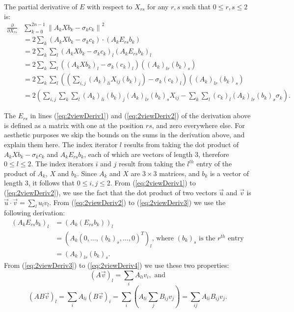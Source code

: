 \documentclass[11pt, oneside, reqno]{book}
\begin{document}
The partial derivative of $E$ with respect to $X_{rs}$ for any $r,s$ such that $0 \le r,s \le 2$ is:
\begin{align}
\frac{\partial}{\partial  X_{rs}} & \sum_{k=0}^{2n-1} \left\| A_k X b_k - \sigma_k c_k \right\|^2 \nonumber\\
&= 2\sum_k \left(A_k X b_k - \sigma_k c_k\right) \cdot \left(A_k E_{rs}b_k\right) \label{eq:2viewDeriv1} \\
&= 2\sum_k \sum_{l} \left(A_k X b_k - \sigma_k c_k\right)_l \left(A_k E_{rs}b_k\right)_l \label{eq:2viewDeriv2} \\
&= 2\sum_k \sum_l 
\left( \left(A_k X b_k\right)_l - \sigma_k \left(c_k\right)_l \right)
\left(\left(A_k\right)_{lr} \left(b_k\right)_s\right) \label{eq:2viewDeriv3} \\
&= 2 \sum_k \sum_l
\left( \left(\sum_{i,j}\left(A_k\right)_{li} X_{ij}\left(b_k\right)_j \right) - \sigma_k \left(c_k\right)_l \right) 
\left(\left(A_k\right)_{lr} \left(b_k\right)_s \right) \label{eq:2viewDeriv4} \\
&= 2\left( 
\sum_{i,j} \sum_k\sum_l \left(A_k\right)_{li} \left(b_k\right)_j \left(A_k\right)_{lr} \left(b_k\right)_s X_{ij} 
- \sum_k \sum_l \left(c_k\right)_l \left(A_k\right)_{lr} \left(b_k\right)_s \sigma_k 
\right). \nonumber
\end{align}

The $E_{rs}$ in lines (\ref{eq:2viewDeriv1}) and (\ref{eq:2viewDeriv2}) of the derivation above is defined as a matrix with one at the position $rs$, and zero everywhere else.
For aesthetic purposes we skip the bounds on the sums in the derivation above, and explain them here. The index iterator $l$ results from taking the dot product of $A_k X b_k - \sigma_k c_k$ and $A_k E_{rs}b_k$, each of which are vectors of length 3, therefore $0 \le l \le 2$. The index iterators $i$ and $j$ result from taking the $l^{th}$ entry of the product of $A_k$, $X$ and $b_k$. Since $A_k$ and $X$ are $3 \times 3$ matrices, and $b_k$ is a vector of length 3, it follows that $0 \le i,j \le 2$. 
From (\ref{eq:2viewDeriv1}) to (\ref{eq:2viewDeriv2}), we use the fact that the dot product of two vectors $\vec{u}$ and $ \vec{v}$ is $\vec{u}\cdot \vec{v} = \sum_l u_l v_l$.
From (\ref{eq:2viewDeriv2}) to (\ref{eq:2viewDeriv3}) we use the following derivation:
\begin{align*}
\left(A_kE_{rs}b_k\right)_l 
&= \left(A_k(E_{rs}b_k)\right)_l \\
&= \left(A_k\left(0,\dots,(b_k)_s,\dots,0\right)^T\right)_l \text{, where } (b_k)_s \text{ is the } r^{th} \text{ entry}\\
&= (A_k)_{lr}(b_k)_s.
\end{align*}
From (\ref{eq:2viewDeriv3}) to (\ref{eq:2viewDeriv4}) we use these two properties:
\[\left(A\vec{v}\right)_l = \sum_i A_{li}v_i, \text{ and}\]
\[ \left(AB\vec{v}\right)_l
= \sum_i A_{li}(B\vec{v})_i 
= \sum_i \left( A_{li} \sum_j B_{ij}v_j \right) 
= \sum_{ij} A_{li}B_{ij}v_j. \]
\end{document}
